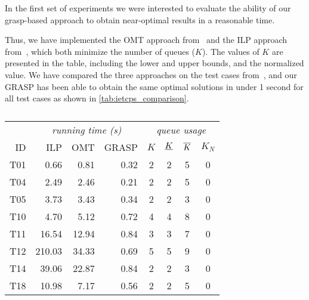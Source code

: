 In the first set of experiments we were interested to evaluate the ability of our \gls{grasp}-based approach to obtain near-optimal results in a reasonable time.
\begin{modifiedparagraph}
Thus, we have implemented the OMT approach from~\cite{craciunas16} and the ILP approach from~\cite{pop16}, which both minimize the number of queues ($K$). The values of $K$ are presented in the table, including the lower and upper bounds, and the normalized value. We have compared the three approaches on the test cases from~\cite{pop16}, and our GRASP has been able to obtain the same optimal solutions in under 1 second for all test cases as shown in \autoref{tab:ietcps_comparison}.
\end{modifiedparagraph}
\begin{table}[t]
   \small
\centering
\begin{modifiedparagraph}
\begin{tabular}{r|rrr|cccc}
    & \multicolumn{3}{c|}{\textit{running time (s)}} & \multicolumn{4}{c}{\textit{queue usage}} \\
ID  & ILP            & OMT           & GRASP         & $K$   & $\underline{K}$   & $\overline{K}$  & $K_N$  \\ \hline
T01 & 0.66           & 0.81          & 0.32          & 2     & 2              & 5             & 0      \\
T04 & 2.49           & 2.46          & 0.21          & 2     & 2              & 5             & 0      \\
T05 & 3.73           & 3.43          & 0.34          & 2     & 2              & 3             & 0      \\
T10 & 4.70           & 5.12          & 0.72          & 4     & 4              & 8             & 0      \\
T11 & 16.54          & 12.94         & 0.84          & 3     & 3              & 7             & 0      \\
T12 & 210.03         & 34.33         & 0.69          & 5     & 5              & 9             & 0      \\
T14 & 39.06          & 22.87         & 0.84          & 2     & 2              & 3             & 0      \\
T18 & 10.98          & 7.17          & 0.56          & 2     & 2              & 5             & 0     
\end{tabular}
\end{modifiedparagraph}
\caption{}
\label{tab:ietcps_comparison}
\end{table}

